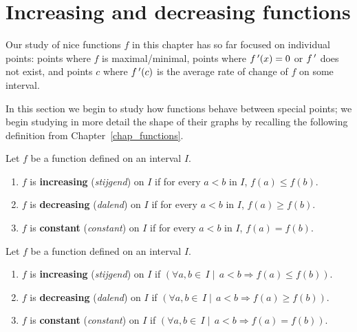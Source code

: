 \section{Increasing and decreasing functions}\label{sec:incr_decr}

Our study of nice functions $f$ in this chapter has so far focused on individual points: points where $f$ is maximal/minimal, points where $f\,'(x) = 0$ or $f\,'$ does not exist, and points $c$ where $f\,'(c)$ is the average rate of change of $f$ on some interval. 

In this section we begin to study how functions behave between special points; we begin studying in more detail the shape of their graphs by recalling the following definition from Chapter~\ref{chap_functions}.

\ifcalculus
\begin{definition}\label{def:incr_decr}
Let $f$ be a function defined on an interval $I$.%
\begin{enumerate}
\item		$f$ is \textbf{increasing} (\textit{stijgend}) on $I$ if for every $a<b$ in $I$, $f(a) \leq f(b)$.
\item		$f$ is \textbf{decreasing} (\textit{dalend}) on $I$ if for every $a<b$ in $I$, $f(a) \geq f(b)$.
\item		$f$ is \textbf{constant} (\textit{constant}) on $I$ if for every $a<b$ in $I$, $f(a) = f(b)$.
\end{enumerate}
\end{definition}
\fi
\ifanalysis
\begin{definition}\label{def:incr_decr}
Let $f$ be a function defined on an interval $I$.%
\begin{enumerate}
\item		$f$ is \textbf{increasing} (\textit{stijgend}) on $I$ if $\left(\forall a,b\in\,I\mid\,a<b\Rightarrow f(a)\leq f(b)\right)$.
\item		$f$ is \textbf{decreasing} (\textit{dalend}) on $I$ if $\left(\forall a,b\in\,I\mid\,a<b\Rightarrow f(a)\geq f(b)\right)$.
\item $f$ is \textbf{constant} (\textit{constant}) on $I$ if $\left(\forall a,b\in\,I\mid\,a<b\Rightarrow f(a)= f(b)\right)$.
\end{enumerate}
\end{definition}
\fi
{}

